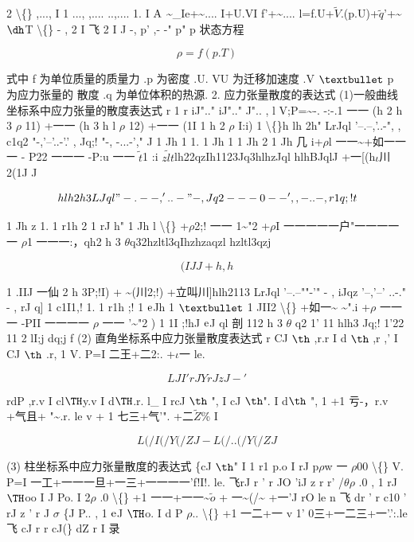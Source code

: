 2 \textbackslash\{\} ,..., I 1 ..., ,.... ..,.... 1. I ${\rm A}$ \textasciitilde{}\_Ie+\textasciitilde{}.... I+U.VI f'+\textasciitilde{}.... l=f.U+$\tilde{V}$.(p.U)+$\tilde{q}$'+\textasciitilde{}${\rm ð}$T \textbackslash\{\} - , 2 I 飞 2 I J -, p' ,- -" p" p 状态方程

\[\rho  = f(p. T)\]

式中 f 为单位质量的质量力 .p 为密度 .U. VU 为迁移加速度 .V ${\rm •}$ p 为应力张量的 散度 .q 为单位体积的热源. 2. 应力张量散度的表达式 (1)一般曲线坐标系中应力张量的散度表达式 r 1 r iJ".." iJ".." J".. , l V;P=\textasciitilde{}-. -:-.1 一一 (h 2 h 3 $\rho$ 11) +一一 (h 3 h l $\rho$ 12) +一一 (1I 1 h 2 $\rho$ I:i) 1 \textbackslash\{\}h lh 2h" LrJql '--.--,'..-", , c1q2 "-,'--'..-'.' , Jq;! "-, -...-'," J 1 Jh 1 1. 1 Jh 1 1 Jh 2 1 Jh 几 i+$\rho$l 一一\textasciitilde{}+如一一一 - P22 一一一 -P:u 一一 $\tilde{t}$1 :i $\tilde{zlt}$lh22qzIh1123Jq3hlhzJql hlhBJqlJ +一[(h$\iota$川2(1J J

\[h lh 2h3 LJql "-.--,'..-"- , Jq2 ---0--' ,,-..- , r1q;! t\]

1 Jh z 1. 1 r1h 2 1 rJ h" 1 Jh l \textbackslash\{\} +$\rho$2;! 一一 1\textasciitilde{}"2 +$\rho$I 一一一一一户"一一一一一 $\rho$1 一一一:，qh2 h 3 $\theta$q32hzltl3qIhzhzaqzl hzltl3qzj

\[(I J J + h ,  h\]

1 .IIJ 一仙 2 h 3P;!I) + \textasciitilde{}(川2;!) +立叫川]hlh2113 LrJql '--.--""-'" - , iJqz '--,'--' ..-." - , rJ q] 1 c1I1,! 1. 1 r1h ;! 1 ${\rm e}$Jh 1 ${\rm •}$ 1 JII2 \textbackslash\{\} +如一\textasciitilde{} \textasciitilde{}".i +$\rho$ 一一一 -PII 一一一一 $\rho$ 一一 '\textasciitilde{}"2 ) 1 1I ;!hJ ${\rm e}$J ql 剖 112 h 3 $\theta$ q2 1' 11 hlh3 Jq;! 1'22 11 2 lI;j dq;j f (2) 直角坐标系中应力张量散度表达式 r CJ ${\rm þ}$ ,r.r I d ${\rm þ}$ ,r ,' I CJ ${\rm þ}$ .r, 1 V. P=I 二王+二2:. +$\iota$一 le.

\[L J I ' rJ Y rJ z J-'\]

rdP ,r.v I cl${\rm Þ}$y.v I d${\rm Þ}$.r. l\_ I rcJ ${\rm þ}$ ", I cJ ${\rm þ}$". I d${\rm þ}$ ", 1 +1 亏-，r.v +气且+ "\textasciitilde{}.r. le v + 1 七三+气'". +二$\tilde{Z}$\% I

\[L (/I (/ Y (/ Z J - L (/.. (/ Y (/ Z J\]

(3) 柱坐标系中应力张量散度的表达式 \{cJ ${\rm þ}$" I 1 r1 p.o I rJ p$\rho$w 一 $\rho$00 \textbackslash\{\} V. P=I 一工+一一一旦+一三+一一一一'f!I!. le. 飞rJ r ' r JO 'iJ z r r' /$\theta$$\rho$ .0 , 1 rJ ${\rm Þ}$oo I J Po. I 2$\rho$ .0 \textbackslash\{\} +1 一一+一一\textasciitilde{}$\tilde{o}$ + 一\textasciitilde{}(/\textasciitilde{} +一'J rO le n 飞 dr ' r c10 ' rJ z ' r J $\sigma$ \{J P.. , 1 ${\rm e}$J ${\rm Þ}$o. I d P $\rho$.. \textbackslash\{\} +1 一二+一 v 1' 0三+一二三+一'.':.le 飞 cJ r r cJ(\} dZ r I 录

